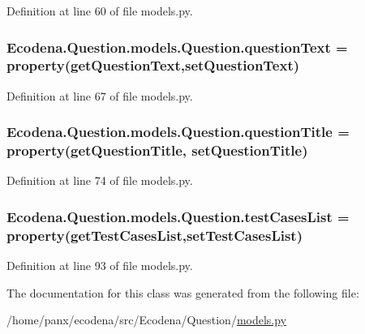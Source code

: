 Definition at line 60 of file models.py.

\hypertarget{class_ecodena_1_1_question_1_1models_1_1_question_a631229209b3603bc293f5c6b751781cc}{
\subsubsection[{questionText}]{\setlength{\rightskip}{0pt plus 5cm}Ecodena.Question.models.Question.questionText = property(getQuestionText,setQuestionText)}}
\label{d1/d67/class_ecodena_1_1_question_1_1models_1_1_question_a631229209b3603bc293f5c6b751781cc}


Definition at line 67 of file models.py.

\hypertarget{class_ecodena_1_1_question_1_1models_1_1_question_aa28e2b08e1d5c9a31737359492c2e1b1}{
\subsubsection[{questionTitle}]{\setlength{\rightskip}{0pt plus 5cm}Ecodena.Question.models.Question.questionTitle = property(getQuestionTitle, setQuestionTitle)}}
\label{d1/d67/class_ecodena_1_1_question_1_1models_1_1_question_aa28e2b08e1d5c9a31737359492c2e1b1}


Definition at line 74 of file models.py.

\hypertarget{class_ecodena_1_1_question_1_1models_1_1_question_aac636325b58fc117b2c89f6ece79f431}{
\subsubsection[{testCasesList}]{\setlength{\rightskip}{0pt plus 5cm}Ecodena.Question.models.Question.testCasesList = property(getTestCasesList,setTestCasesList)}}
\label{d1/d67/class_ecodena_1_1_question_1_1models_1_1_question_aac636325b58fc117b2c89f6ece79f431}


Definition at line 93 of file models.py.



The documentation for this class was generated from the following file:\begin{DoxyCompactItemize}
\item 
/home/panx/ecodena/src/Ecodena/Question/\hyperlink{_question_2models_8py}{models.py}\end{DoxyCompactItemize}
